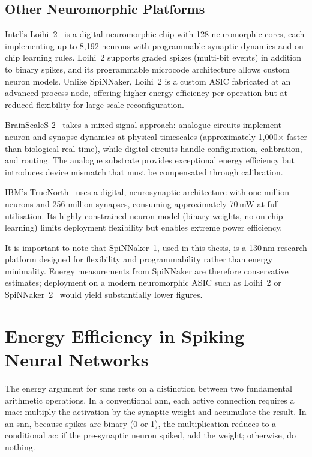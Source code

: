 \subsection{Other Neuromorphic Platforms}
\label{subsec:other-neuromorphic}

Intel's Loihi~2~\citep{orchard2021} is a digital neuromorphic chip with 128 neuromorphic cores, each implementing up to 8{,}192 neurons with programmable synaptic dynamics and on-chip learning rules. Loihi~2 supports graded spikes (multi-bit events) in addition to binary spikes, and its programmable microcode architecture allows custom neuron models. Unlike SpiNNaker, Loihi~2 is a custom ASIC fabricated at an advanced process node, offering higher energy efficiency per operation but at reduced flexibility for large-scale reconfiguration.

BrainScaleS-2~\citep{pehle2022} takes a mixed-signal approach: analogue circuits implement neuron and synapse dynamics at physical timescales (approximately 1{,}000$\times$ faster than biological real time), while digital circuits handle configuration, calibration, and routing. The analogue substrate provides exceptional energy efficiency but introduces device mismatch that must be compensated through calibration.

IBM's TrueNorth~\citep{merolla2014} uses a digital, neurosynaptic architecture with one million neurons and 256 million synapses, consuming approximately 70\,mW at full utilisation. Its highly constrained neuron model (binary weights, no on-chip learning) limits deployment flexibility but enables extreme power efficiency.

It is important to note that SpiNNaker~1, used in this thesis, is a 130\,nm research platform designed for flexibility and programmability rather than energy minimality. Energy measurements from SpiNNaker are therefore conservative estimates; deployment on a modern neuromorphic ASIC such as Loihi~2 or SpiNNaker~2~\citep{mayr2019} would yield substantially lower figures.


\section{Energy Efficiency in Spiking Neural Networks}
\label{sec:energy-background}

The energy argument for \glspl{snn} rests on a distinction between two fundamental arithmetic operations. In a conventional \gls{ann}, each active connection requires a \gls{mac}: multiply the activation by the synaptic weight and accumulate the result. In an \gls{snn}, because spikes are binary (0 or 1), the multiplication reduces to a conditional \gls{ac}: if the pre-synaptic neuron spiked, add the weight; otherwise, do nothing.

